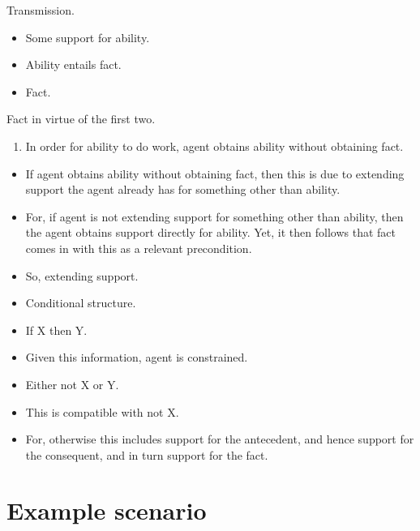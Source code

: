 Transmission.

\begin{itemize}
\item Some support for ability.
\item Ability entails fact.
\item Fact.
\end{itemize}

Fact in virtue of the first two.

\begin{enumerate}
\item In order for ability to do work, agent obtains ability without obtaining fact.
\end{enumerate}

\begin{itemize}
\item If agent obtains ability without obtaining fact, then this is due to extending support the agent already has for something other than ability.
\item For, if agent is not extending support for something other than ability, then the agent obtains support directly for ability.
  Yet, it then follows that fact comes in with this as a relevant precondition.
\end{itemize}

\begin{itemize}
\item So, extending support.
\end{itemize}

\begin{itemize}
\item Conditional structure.
\item If X then Y.
\item Given this information, agent is constrained.
\item Either not X or Y.
\end{itemize}

\begin{itemize}
\item This is compatible with not X.
\item For, otherwise this includes support for the antecedent, and hence support for the consequent, and in turn support for the fact.
\end{itemize}

\section{Example scenario}
\label{sec:example-cases}

